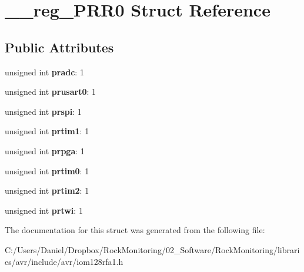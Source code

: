\hypertarget{struct____reg___p_r_r0}{}\section{\+\_\+\+\_\+reg\+\_\+\+P\+R\+R0 Struct Reference}
\label{struct____reg___p_r_r0}
\subsection*{Public Attributes}
\begin{DoxyCompactItemize}
\item 
unsigned int {\bfseries pradc}\+: 1\hypertarget{struct____reg___p_r_r0_a33b99795237751911dd33f722e0b402a}{}\label{struct____reg___p_r_r0_a33b99795237751911dd33f722e0b402a}

\item 
unsigned int {\bfseries prusart0}\+: 1\hypertarget{struct____reg___p_r_r0_a79a87e5c9736b32dc21ba07d3d69c1ee}{}\label{struct____reg___p_r_r0_a79a87e5c9736b32dc21ba07d3d69c1ee}

\item 
unsigned int {\bfseries prspi}\+: 1\hypertarget{struct____reg___p_r_r0_ab083d638a4ffead9d44039a2d4aaceaa}{}\label{struct____reg___p_r_r0_ab083d638a4ffead9d44039a2d4aaceaa}

\item 
unsigned int {\bfseries prtim1}\+: 1\hypertarget{struct____reg___p_r_r0_a92bcd99405df7b5f8d3412f84171cff2}{}\label{struct____reg___p_r_r0_a92bcd99405df7b5f8d3412f84171cff2}

\item 
unsigned int {\bfseries prpga}\+: 1\hypertarget{struct____reg___p_r_r0_a0cb415eb727f31e0eb7c8a6aacada8a8}{}\label{struct____reg___p_r_r0_a0cb415eb727f31e0eb7c8a6aacada8a8}

\item 
unsigned int {\bfseries prtim0}\+: 1\hypertarget{struct____reg___p_r_r0_aeb8b2b4cf99b64ce678a973717744c29}{}\label{struct____reg___p_r_r0_aeb8b2b4cf99b64ce678a973717744c29}

\item 
unsigned int {\bfseries prtim2}\+: 1\hypertarget{struct____reg___p_r_r0_abb3b29a471cc5e891fcafac758ad9ea9}{}\label{struct____reg___p_r_r0_abb3b29a471cc5e891fcafac758ad9ea9}

\item 
unsigned int {\bfseries prtwi}\+: 1\hypertarget{struct____reg___p_r_r0_a99e89b2be49b220505d5b09ea653c702}{}\label{struct____reg___p_r_r0_a99e89b2be49b220505d5b09ea653c702}

\end{DoxyCompactItemize}


The documentation for this struct was generated from the following file\+:\begin{DoxyCompactItemize}
\item 
C\+:/\+Users/\+Daniel/\+Dropbox/\+Rock\+Monitoring/02\+\_\+\+Software/\+Rock\+Monitoring/libraries/avr/include/avr/iom128rfa1.\+h\end{DoxyCompactItemize}

